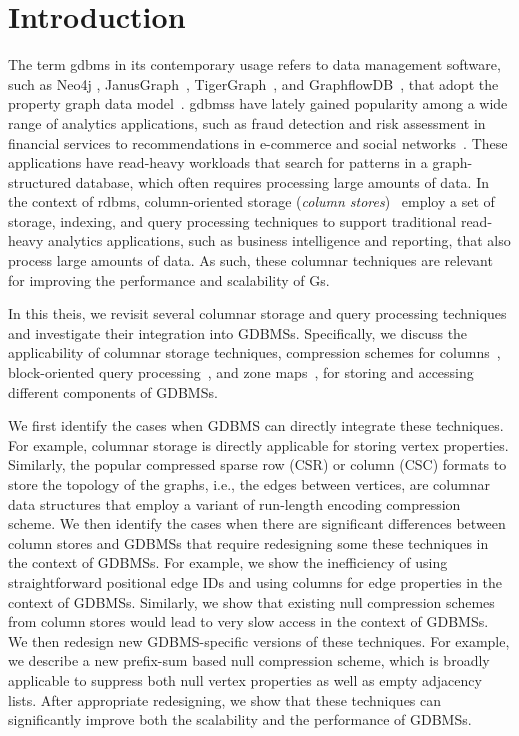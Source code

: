 
\chapter{Introduction}
\label{introduction}

The term \gls{gdbms} in its contemporary usage refers to data management software, such as Neo4j \cite{neo4j}, JanusGraph~\cite{janusgraph}, TigerGraph~\cite{tigergraph}, and GraphflowDB~\cite{kankanamge:graphflow, mhedhbi:sqs}, that adopt the property graph data model~\cite{neo4j-property-graph-model}. \gls{gdbms}s have lately gained popularity among a wide range of analytics applications, such as fraud detection and risk assessment in financial services to recommendations in e-commerce and social networks~\cite{sahu:survey}. These applications have read-heavy workloads that search for patterns in a graph-structured database, which often requires processing large amounts of data. In the context of \gls{rdbms}, column-oriented storage ({\em column stores})~\cite{c-store, monetdb, vectorwise, oracle, ziauddin:zone-maps, ms} employ a set of storage, indexing, and query processing techniques to support traditional read-heavy analytics applications, such as business intelligence and reporting, that also process large amounts of data. As such, these columnar techniques are relevant for improving the performance and scalability of Gs.

In this theis, we revisit several columnar storage and query processing techniques and investigate their integration into GDBMSs. Specifically, we discuss the applicability of columnar storage techniques, compression schemes for columns~\cite{}, block-oriented query processing~\cite{}, and zone maps~\cite{}, for storing and accessing different components of GDBMSs. 

We first identify the cases when GDBMS can directly integrate these techniques. For example, columnar storage is directly applicable for storing vertex properties. Similarly, the popular compressed sparse row (CSR) or column (CSC) formats to store the topology of the graphs, i.e., the edges between vertices, are columnar data structures that employ a variant of run-length encoding compression scheme. We then identify the cases when there are significant differences between column stores and GDBMSs that require redesigning some these techniques in the context of GDBMSs. For example, we show the inefficiency of using straightforward positional edge IDs and using columns for edge properties in the context of GDBMSs. Similarly, we show that existing null compression schemes from column stores would lead to very slow access in the context of GDBMSs. We then redesign new GDBMS-specific versions of these techniques. For example, we describe a new prefix-sum based null compression scheme, which is broadly applicable to suppress both null vertex properties as well as empty adjacency lists. After appropriate redesigning, we show that these techniques can significantly improve both the scalability and the performance of GDBMSs.

